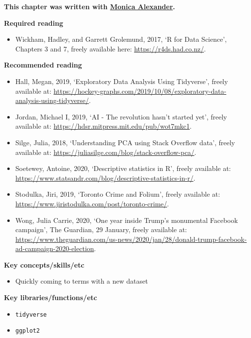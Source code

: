 \documentclass[
]{book}
\providecommand{\tightlist}{%
  \setlength{\itemsep}{0pt}\setlength{\parskip}{0pt}}
\begin{document}
\textbf{This chapter was written with \href{https://www.monicaalexander.com/}{Monica Alexander}.}

\textbf{Required reading}

\begin{itemize}
\tightlist
\item
  Wickham, Hadley, and Garrett Grolemund, 2017, `R for Data Science', Chapters 3 and 7, freely available here: \url{https://r4ds.had.co.nz/}.
\end{itemize}

\textbf{Recommended reading}

\begin{itemize}
\tightlist
\item
  Hall, Megan, 2019, `Exploratory Data Analysis Using Tidyverse', freely available at: \url{https://hockey-graphs.com/2019/10/08/exploratory-data-analysis-using-tidyverse/}.
\item
  Jordan, Michael I, 2019, `AI - The revolution hasn't started yet', freely available at: \url{https://hdsr.mitpress.mit.edu/pub/wot7mkc1}.
\item
  Silge, Julia, 2018, `Understanding PCA using Stack Overflow data', freely available at: \url{https://juliasilge.com/blog/stack-overflow-pca/}.
\item
  Soetewey, Antoine, 2020, `Descriptive statistics in R', freely available at: \url{https://www.statsandr.com/blog/descriptive-statistics-in-r/}.
\item
  Stodulka, Jiri, 2019, `Toronto Crime and Folium', freely available at: \url{https://www.jiristodulka.com/post/toronto-crime/}.
\item
  Wong, Julia Carrie, 2020, `One year inside Trump's monumental Facebook campaign', The Guardian, 29 January, freely available at: \url{https://www.theguardian.com/us-news/2020/jan/28/donald-trump-facebook-ad-campaign-2020-election}.
\end{itemize}

\textbf{Key concepts/skills/etc}

\begin{itemize}
\tightlist
\item
  Quickly coming to terms with a new dataset
\end{itemize}

\textbf{Key libraries/functions/etc}

\begin{itemize}
\tightlist
\item
  \texttt{tidyverse}
\item
  \texttt{ggplot2}
\end{itemize}
\end{document}
